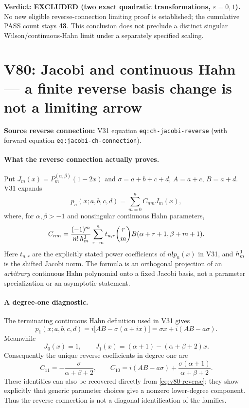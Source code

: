 \documentclass[11pt]{article}
\begin{document}
\noindent\textbf{Verdict: EXCLUDED (two exact quadratic
transformations, $\varepsilon=0,1$).} No new eligible reverse-connection
limiting proof is established; the cumulative PASS count stays
\textbf{43}. This conclusion does not preclude a distinct singular
Wilson/continuous-Hahn limit under a separately specified scaling.


\section{V80: Jacobi and continuous Hahn --- a finite reverse basis change is not a limiting arrow}
\noindent\textbf{Source reverse connection:} V31 equation
\texttt{eq:ch-jacobi-reverse} (with forward equation
\texttt{eq:jacobi-ch-connection}).

\paragraph{What the reverse connection actually proves.}
Put $J_m(x)=P_m^{(\alpha,\beta)}(1-2x)$ and
$\sigma=a+b+c+d$, $A=a+c$, $B=a+d$. V31 expands
\[
 p_n(x;a,b,c,d)=\sum_{m=0}^n C_{nm}J_m(x),
\]
where, for $\alpha,\beta>-1$ and nonsingular continuous Hahn
parameters,
\begin{equation}\label{eq:v80-reverse}
 C_{nm}=\frac{(-1)^m}{n!\,h_m^{\rm J}}
 \sum_{r=m}^n t_{n,r}\binom rm
 B(\alpha+r+1,\beta+m+1).
\end{equation}
Here $t_{n,r}$ are the explicitly stated power coefficients of
$n!p_n(x)$ in V31, and $h_m^{\rm J}$ is the shifted Jacobi norm.
The formula is an orthogonal projection of an \emph{arbitrary}
continuous Hahn polynomial onto a fixed Jacobi basis, not a parameter
specialization or an asymptotic statement.

\paragraph{A degree-one diagnostic.}
The terminating continuous Hahn definition used in V31 gives
\[
 p_1(x;a,b,c,d)
 =i\bigl[AB-\sigma(a+ix)\bigr]
 =\sigma x+i(AB-a\sigma).
\]
Meanwhile
\[
 J_0(x)=1,\qquad
 J_1(x)=(\alpha+1)-(\alpha+\beta+2)x.
\]
Consequently the unique reverse coefficients in degree one are
\begin{equation}\label{eq:v80-degree-one}
 C_{11}=-\frac{\sigma}{\alpha+\beta+2},\qquad
 C_{10}=i(AB-a\sigma)
 +\frac{\sigma(\alpha+1)}{\alpha+\beta+2}.
\end{equation}
These identities can also be recovered directly from
\eqref{eq:v80-reverse}; they show explicitly that generic parameter
choices give a nonzero lower-degree component.  Thus the reverse
connection is not a diagonal identification of the families.
\end{document}
